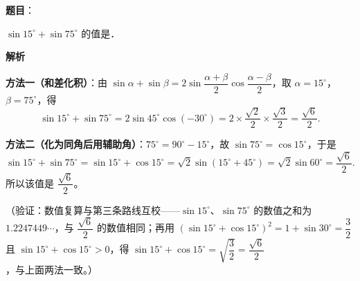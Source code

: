\begin{answer}

\textbf{题目}：

\(\sin 15^{\circ}+\sin 75^{\circ}\) 的值是\gkblank{}．

\textbf{解析}

\textbf{方法一（和差化积）}：由 \(\sin\alpha+\sin\beta=2\sin\dfrac{\alpha+\beta}{2}\cos\dfrac{\alpha-\beta}{2}\)，取 \(\alpha=15^{\circ}\)，\(\beta=75^{\circ}\)，得
\nopagebreak[4]
\[
\sin15^{\circ}+\sin75^{\circ}=2\sin45^{\circ}\cos(-30^{\circ})=2\times\dfrac{\sqrt2}{2}\times\dfrac{\sqrt3}{2}=\dfrac{\sqrt6}{2}.
\]

\textbf{方法二（化为同角后用辅助角）}：\(75^{\circ}=90^{\circ}-15^{\circ}\)，故 \(\sin75^{\circ}=\cos15^{\circ}\)，于是
\nopagebreak[4]
\[
\sin15^{\circ}+\sin75^{\circ}=\sin15^{\circ}+\cos15^{\circ}=\sqrt2\sin(15^{\circ}+45^{\circ})=\sqrt2\sin60^{\circ}=\dfrac{\sqrt6}{2}.
\]
所以该值是 \(\dfrac{\sqrt6}{2}\)。

（验证：数值复算与第三条路线互校——\(\sin15^{\circ}\)、\(\sin75^{\circ}\) 的数值之和为 \(1.2247449\cdots\)，与 \(\dfrac{\sqrt6}{2}\) 的数值相同；再用 \((\sin15^{\circ}+\cos15^{\circ})^2=1+\sin30^{\circ}=\dfrac32\) 且 \(\sin15^{\circ}+\cos15^{\circ}>0\)，得 \(\sin15^{\circ}+\cos15^{\circ}=\sqrt{\dfrac32}=\dfrac{\sqrt6}{2}\)，与上面两法一致。）


\end{answer}
